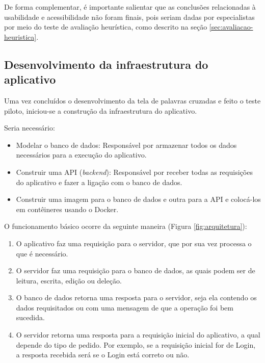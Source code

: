 De forma complementar, é importante salientar que as conclusões relacionadas à usabilidade e acessibilidade não foram finais, pois seriam dadas por especialistas por meio do teste de avaliação heurística, como descrito na seção \ref{sec:avaliacao-heuristica}.

\subsection{Desenvolvimento da infraestrutura do aplicativo}
Uma vez concluídos o desenvolvimento da tela de palavras cruzadas e feito o teste piloto, iniciou-se a construção da infraestrutura do aplicativo.

Seria necessário:
\begin{itemize}
    \item Modelar o banco de dados: Responsável por armazenar todos os dados necessários para a execução do aplicativo.

    \item Construir uma API (\textit{backend}): Responsável por receber todas as requisições do aplicativo e fazer a ligação com o banco de dados.
    
    \item Construir uma imagem para o banco de dados e outra para a API e colocá-los em contêineres usando o Docker.
\end{itemize}


O funcionamento básico ocorre da seguinte maneira (Figura \ref{fig:arquitetura}):
\begin{enumerate}
    \item O aplicativo faz uma requisição para o servidor, que por sua vez processa o que é necessário.
    
    \item O servidor faz uma requisição para o banco de dados, as quais podem ser de leitura, escrita, edição ou deleção.
    
    \item O banco de dados retorna uma resposta para o servidor, seja ela contendo os dados requisitados ou com uma mensagem de que a operação foi bem sucedida.
    
    \item O servidor retorna uma resposta para a requisição inicial do aplicativo, a qual depende do tipo de pedido. Por exemplo, se a requisição inicial for de Login, a resposta recebida será se o Login está correto ou não.
\end{enumerate}

